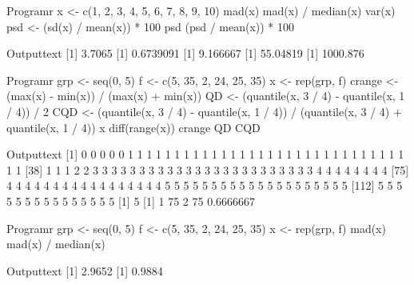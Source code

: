 \begin{code}
    {Program}{r}
x <- c(1, 2, 3, 4, 5, 6, 7, 8, 9, 10)
mad(x)
mad(x) / median(x)
var(x)
psd <- (sd(x) / mean(x)) * 100
psd
(psd / mean(x)) * 100
\end{code}
\begin{code}
    {Output}{text}
[1] 3.7065
[1] 0.6739091
[1] 9.166667
[1] 55.04819
[1] 1000.876
\end{code}

\begin{code}
    {Program}{r}
grp <- seq(0, 5)
f <- c(5, 35, 2, 24, 25, 35)
x <- rep(grp, f)
crange <- (max(x) - min(x)) / (max(x) + min(x))
QD <- (quantile(x, 3 / 4) - quantile(x, 1 / 4)) / 2
CQD <- (quantile(x, 3 / 4) - quantile(x, 1 / 4)) / (quantile(x, 3 / 4) + quantile(x, 1 / 4))
x
diff(range(x))
crange
QD
CQD
\end{code}
\newpage
\begin{code}
    {Output}{text}
  [1] 0 0 0 0 0 1 1 1 1 1 1 1 1 1 1 1 1 1 1 1 1 1 1 1 1 1 1 1 1 1 1 1 1 1 1 1 1
 [38] 1 1 1 2 2 3 3 3 3 3 3 3 3 3 3 3 3 3 3 3 3 3 3 3 3 3 3 3 3 4 4 4 4 4 4 4 4
 [75] 4 4 4 4 4 4 4 4 4 4 4 4 4 4 4 4 4 5 5 5 5 5 5 5 5 5 5 5 5 5 5 5 5 5 5 5 5
[112] 5 5 5 5 5 5 5 5 5 5 5 5 5 5 5
[1] 5
[1] 1
75%
  2
      75%
0.6666667
\end{code}

\begin{code}
    {Program}{r}
grp <- seq(0, 5)
f <- c(5, 35, 2, 24, 25, 35)
x <- rep(grp, f)
mad(x)
mad(x) / median(x)
\end{code}
\begin{code}
    {Output}{text}
[1] 2.9652
[1] 0.9884
\end{code}

